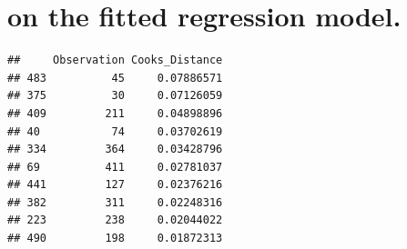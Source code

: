 \documentclass[
]{article}
\newenvironment{Shaded}{\begin{snugshade}}{\end{snugshade}}
\newcommand{\AttributeTok}[1]{\textcolor[rgb]{0.13,0.29,0.53}{#1}}
\newcommand{\DecValTok}[1]{\textcolor[rgb]{0.00,0.00,0.81}{#1}}
\newcommand{\FunctionTok}[1]{\textcolor[rgb]{0.13,0.29,0.53}{\textbf{#1}}}
\newcommand{\NormalTok}[1]{#1}
\newcommand{\OtherTok}[1]{\textcolor[rgb]{0.56,0.35,0.01}{#1}}
\newcommand{\SpecialCharTok}[1]{\textcolor[rgb]{0.81,0.36,0.00}{\textbf{#1}}}
\begin{document}
\section{on the fitted regression
model.}\label{on-the-fitted-regression-model.}

\begin{Shaded}
\end{Shaded}

\begin{verbatim}
##     Observation Cooks_Distance
## 483          45     0.07886571
## 375          30     0.07126059
## 409         211     0.04898896
## 40           74     0.03702619
## 334         364     0.03428796
## 69          411     0.02781037
## 441         127     0.02376216
## 382         311     0.02248316
## 223         238     0.02044022
## 490         198     0.01872313
\end{verbatim}

\begin{Shaded}
\end{Shaded}
\end{document}
